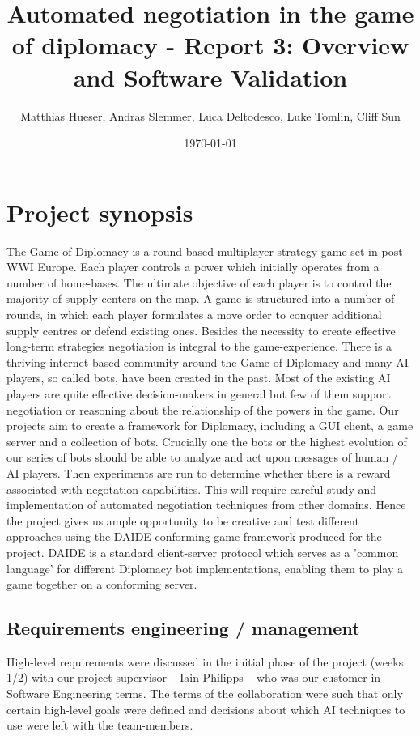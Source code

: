 \documentclass[11pt]{article}
\title{Automated negotiation in the game of diplomacy - Report 3: Overview and Software Validation}
\author{Matthias Hueser, Andras Slemmer, Luca Deltodesco, Luke Tomlin, Cliff Sun}
\date{\today}
\begin{document}
\maketitle

\section{Project synopsis}
The Game of Diplomacy is a round-based multiplayer strategy-game set in post WWI
Europe. Each player controls a power which initially operates from a number of 
home-bases. The ultimate objective of each player is to control the majority of
supply-centers on the map. A game is structured into a number of rounds, in which
each player formulates a move order to conquer additional supply centres or
defend existing ones. Besides the necessity to create effective long-term
strategies negotiation is integral to the game-experience. There is a thriving
internet-based community around the Game of Diplomacy and many AI players, so
called bots, have been created in the past. Most of the existing AI players are
quite effective decision-makers in general but few of them support negotiation
or reasoning about the relationship of the powers in the game. Our projects aim
to create a framework for Diplomacy, including a GUI client, a game server and a
collection of bots. Crucially one the bots or the highest evolution of our series
of bots should be able to analyze and act upon messages of human / AI players.
Then experiments are run to determine whether there is a reward associated with
negotation capabilities. This will require careful study and implementation of
automated negotiation techniques from other domains. Hence the project gives us
ample opportunity to be creative and test different approaches using the
DAIDE-conforming game framework produced for the project. DAIDE is a standard
client-server protocol which serves as a 'common language' for different Diplomacy
bot implementations, enabling them to play a game together on a conforming
server.

\subsection{Requirements engineering / management}
High-level requirements were discussed in the initial phase of the project 
(weeks 1/2) with our project supervisor -- Iain Philipps -- who was our customer
in Software Engineering terms. The terms of the collaboration were such that 
only certain high-level goals were defined and decisions about which AI techniques
to use were left with the team-members.
\end{document}
